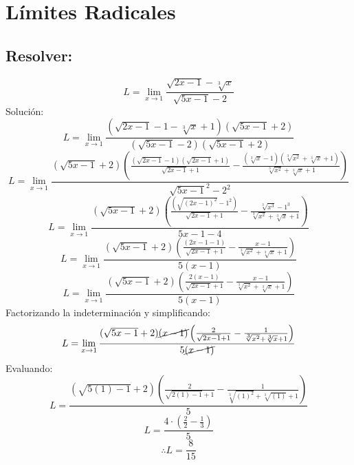 \section{Límites Radicales}
\subsection{Resolver:}
\[ L=\lim_{x \to 1} \frac{\sqrt{2x-1}-\sqrt[3]{x}}{\sqrt{5x-1}-2}\]
Solución:
\[L=\lim_{x \to 1} \frac{(\sqrt{2x-1}-1-\sqrt[3]{x}+1)(\sqrt{5x-1}+2)}{(\sqrt{5x-1}-2)(\sqrt{5x-1}+2)}\]
\[L=\lim_{x \to 1} \frac{(\sqrt{5x-1}+2) \left(\frac{(\sqrt{2x-1}-1)(\sqrt{2x-1}+1)}{\sqrt{2x-1}+1}-\frac{(\sqrt[3]{x}-1)(\sqrt[3]{x^2}+\sqrt[3]{x}+1)}{\sqrt[3]{x^2}+\sqrt[3]{x}+1}\right)}{\sqrt{5x-1}^2-2^2}\]
\[L=\lim_{x \to 1} \frac{(\sqrt{5x-1}+2)\left(\frac{(\sqrt{(2x-1)^2}-1^2)}{\sqrt{2x-1}+1}-\frac{\sqrt[3]{x^3}-1^3}{\sqrt[3]{x^2}+\sqrt[3]{x}+1}\right)}{5x-1-4}\]
\[L=\lim_{x \to 1} \frac{(\sqrt{5x-1}+2)\left(\frac{(2x-1-1)}{\sqrt{2x-1}+1}-\frac{x-1}{\sqrt[3]{x^2}+\sqrt[3]{x}+1}\right)}{5(x-1)}\]
\[L=\lim_{x \to 1} \frac{(\sqrt{5x-1}+2)\left(\frac{2(x-1)}{\sqrt{2x-1}+1}-\frac{x-1}{\sqrt[3]{x^2}+\sqrt[3]{x}+1}\right)}{5(x-1)}\]
Factorizando la indeterminación y simplificando:
\[L=\lim_{x \to 1} \frac{(\sqrt{5x-1}+2) \cancel{(x-1)}\left(\frac{2}{\sqrt{2x-1}+1}-\frac{1}{\sqrt[3]{x^2}+\sqrt[3]{x}+1}\right)}{5\cancel{(x-1)}}\]
Evaluando:
\[L=\frac{(\sqrt{5(1)-1}+2) \left(\frac{2}{\sqrt{2(1)-1}+1}-\frac{1}{\sqrt[3]{(1)^2}+\sqrt[3]{(1)}+1}\right)}{5}\]
\[L=\frac{4\cdot \left(\frac{2}{2}-\frac{1}{3} \right)}{5}\]
\[\therefore L=\frac{8}{15}\]